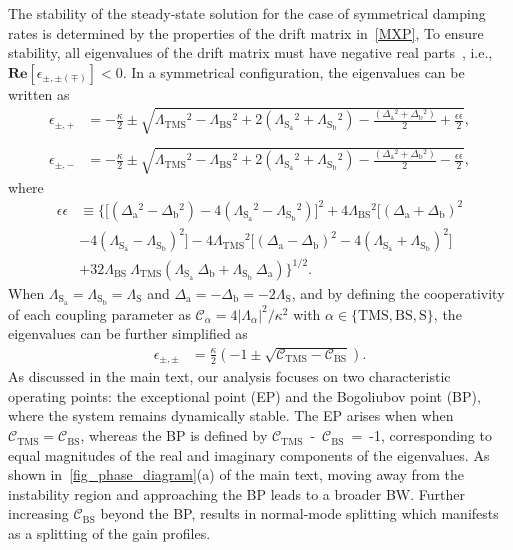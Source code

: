 \documentclass[%
reprint,
floatfix,
superscriptaddress,
amsmath,amssymb,
aps,
pra,
]{revtex4-2}
\newcommand*{\scrpt}[1]{\mathrm{#1}}
\newcommand*{\s}[1]{\ensuremath{_\scrpt{#1}}}
\begin{document}
The stability of the steady-state solution for the case of symmetrical damping rates is determined by the properties of the drift matrix in~\cref{MXP}, 
% 
To ensure stability, all eigenvalues of the drift matrix must have negative real parts~\cite{dejesusRouthHurwitzCriterionExamination1987}, i.e., $\mathbf{Re}[\epsilon_{\pm, \pm(\mp)}] < 0$. In a symmetrical configuration, the eigenvalues can be written as
%
\begin{subequations}
\label{EV_MXP}
\begin{align}
\epsilon_{\pm, +} & = -\frac{\kappa}{2} \pm \sqrt{\Lambda\s{TMS}^2 - \Lambda\s{BS}^2 + 2 \left( \Lambda\s{S\s{a}}^2 + \Lambda\s{S\s{b}}^2 \right) -\frac{( \Delta\s{a}^2 + \Delta\s{b}^2 )}{2}  +  \frac{\epsilon \epsilon}{2}}, \nonumber \\
\\
\epsilon_{\pm, -} & = -\frac{\kappa}{2} \pm \sqrt{\Lambda\s{TMS}^2 - \Lambda\s{BS}^2 + 2 \left( \Lambda\s{S\s{a}}^2 + \Lambda\s{S\s{b}}^2 \right) -\frac{( \Delta\s{a}^2 + \Delta\s{b}^2 )}{2}  - \frac{\epsilon \epsilon}{2}}, \nonumber
\end{align}
\end{subequations}
%
where 
%
\begin{align}
\label{ee}
\epsilon\epsilon & \equiv \Big\lbrace \Big[ (\Delta\s{a}^2-\Delta\s{b}^2) - 4 \left(\Lambda\s{S\s{a}}^2-\Lambda\s{S\s{b}}^2 \right) \Big]^2 + 4 \Lambda\s{BS}^2 \Big[ (\Delta\s{a}+\Delta\s{b})^2 \nonumber \\
& - 4 (\Lambda\s{S\s{a}}-\Lambda\s{S\s{b}})^2 \Big] - 4 \Lambda\s{TMS}^2 \Big[ (\Delta\s{a}-\Delta\s{b})^2 - 4 (\Lambda\s{S\s{a}} + \Lambda\s{S\s{b}})^2 \Big] \nonumber \\ 
& + 32 \Lambda\s{BS} \:\Lambda\s{TMS} \left( \Lambda\s{S\s{a}} \:\Delta\s{b} + \Lambda\s{S\s{b}} \:\Delta\s{a} \right) \Big\rbrace^{1/2}. 
\end{align}
%
When $\Lambda\s{S\s{a}} = \Lambda\s{S\s{b}} = \Lambda\s{S}$ and $\Delta\s{a} = -\Delta\s{b} = -2\Lambda\s{S}$, and by defining the cooperativity of each coupling parameter as $\mathcal{C}_{\alpha} = 4|\Lambda_{\alpha}|^2 / \kappa^2$ with $\alpha \in \lbrace \mathrm{TMS}, \mathrm{BS}, \mathrm{S} \rbrace$, the eigenvalues can be further simplified as
%
\begin{align}
\label{Eigenvalues_M2}
\epsilon_{\pm, \pm} & = \frac{\kappa}{2} \left(-1 \pm \sqrt{\mathcal{C}_{\mathrm{TMS}} - \mathcal{C}_{\mathrm{BS}}} \right). 
\end{align}
%
As discussed in the main text, our analysis focuses on two characteristic operating points: the exceptional point (EP) and the Bogoliubov point (BP), where the system remains dynamically stable. The EP arises when when $\mathcal{C}\s{TMS} = \mathcal{C}\s{BS}$, whereas the BP is defined by $\mathcal{C}\s{TMS}$~-~$\mathcal{C}\s{BS}$~=~-1, corresponding to equal magnitudes of the real and imaginary components of the eigenvalues. As shown in~\cref{fig_phase_diagram}(a) of the main text, moving away from the instability region and approaching the BP leads to a broader BW. Further increasing $\mathcal{C}\s{BS}$ beyond the BP, results in normal-mode splitting which manifests as a splitting of the gain profiles.
\end{document}
